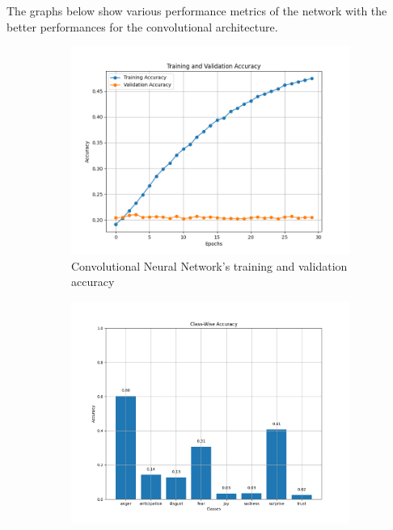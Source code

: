 The graphs below show various performance metrics of the network with the better
performances for the convolutional architecture.
\begin{figure}[H]
    \centering
    \begin{subfigure}{0.48\textwidth}
        \includegraphics[width=\textwidth]{pictures/cnn_accuracy.png}
        \caption{Convolutional Neural Network's training and validation accuracy}
        \label{fig:cnn_train_val_acc}
    \end{subfigure}
    \begin{subfigure}{0.5\textwidth}
        \includegraphics[width=\textwidth]{pictures/cnn_class_accuracy.png}

\end{subfigure}
\end{figure}

